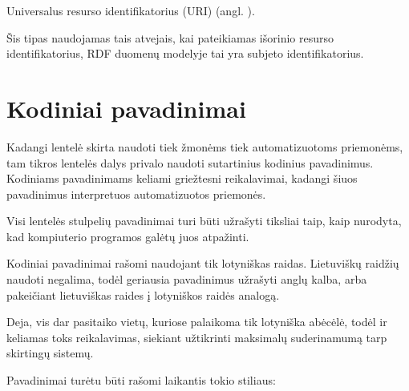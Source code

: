 \documentclass[letterpaper,10pt,lithuanian]{sphinxmanual}
\begin{document}

\begin{fulllineitems}
\label{\detokenize{tipai:type.uri}}
\pysigstartsignatures
{}
\pysigstopsignatures
\sphinxAtStartPar
Universalus resurso identifikatorius (URI) (angl. ).

\sphinxAtStartPar
Šis tipas naudojamas tais atvejais, kai pateikiamas išorinio resurso
identifikatorius, RDF duomenų modelyje tai yra subjeto identifikatorius.

\sphinxAtStartPar
{}

\end{fulllineitems}


\sphinxstepscope


\section{Kodiniai pavadinimai}
\label{\detokenize{pavadinimai:kodiniai-pavadinimai}}\label{\detokenize{pavadinimai:id1}}\label{\detokenize{pavadinimai::doc}}
\sphinxAtStartPar
Kadangi {\hyperref[\detokenize{savokos:term-DSA}]{}} lentelė skirta naudoti tiek žmonėms tiek automatizuotoms
priemonėms, tam tikros lentelės dalys privalo naudoti sutartinius kodinius
pavadinimus. Kodiniams pavadinimams keliami griežtesni reikalavimai, kadangi
šiuos pavadinimus interpretuos automatizuotos priemonės.

\sphinxAtStartPar
Visi {\hyperref[\detokenize{savokos:term-DSA}]{}} lentelės stulpelių pavadinimai turi būti užrašyti tiksliai
taip, kaip nurodyta, kad kompiuterio programos galėtų juos atpažinti.

\sphinxAtStartPar
Kodiniai pavadinimai rašomi naudojant tik lotyniškas raidas. Lietuviškų
raidžių naudoti negalima, todėl geriausia pavadinimus užrašyti anglų kalba,
arba pakeičiant lietuviškas raides į lotyniškos raidės analogą.

\sphinxAtStartPar
Deja, vis dar pasitaiko vietų, kuriose palaikoma tik lotyniška abėcėlė, todėl
ir keliamas toks reikalavimas, siekiant užtikrinti maksimalų suderinamumą
tarp skirtingų sistemų.

\sphinxAtStartPar
Pavadinimai turėtu būti rašomi laikantis tokio stiliaus:
\end{document}
